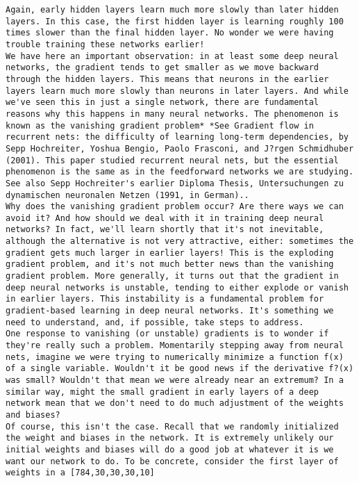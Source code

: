 \begin{lstlisting}
Again, early hidden layers learn much more slowly than later hidden layers. In this case, the first hidden layer is learning roughly 100 times slower than the final hidden layer. No wonder we were having trouble training these networks earlier!
We have here an important observation: in at least some deep neural networks, the gradient tends to get smaller as we move backward through the hidden layers. This means that neurons in the earlier layers learn much more slowly than neurons in later layers. And while we've seen this in just a single network, there are fundamental reasons why this happens in many neural networks. The phenomenon is known as the vanishing gradient problem* *See Gradient flow in recurrent nets: the difficulty of learning long-term dependencies, by Sepp Hochreiter, Yoshua Bengio, Paolo Frasconi, and J?rgen Schmidhuber (2001). This paper studied recurrent neural nets, but the essential phenomenon is the same as in the feedforward networks we are studying. See also Sepp Hochreiter's earlier Diploma Thesis, Untersuchungen zu dynamischen neuronalen Netzen (1991, in German)..
Why does the vanishing gradient problem occur? Are there ways we can avoid it? And how should we deal with it in training deep neural networks? In fact, we'll learn shortly that it's not inevitable, although the alternative is not very attractive, either: sometimes the gradient gets much larger in earlier layers! This is the exploding gradient problem, and it's not much better news than the vanishing gradient problem. More generally, it turns out that the gradient in deep neural networks is unstable, tending to either explode or vanish in earlier layers. This instability is a fundamental problem for gradient-based learning in deep neural networks. It's something we need to understand, and, if possible, take steps to address.
One response to vanishing (or unstable) gradients is to wonder if they're really such a problem. Momentarily stepping away from neural nets, imagine we were trying to numerically minimize a function f(x)
of a single variable. Wouldn't it be good news if the derivative f?(x)
was small? Wouldn't that mean we were already near an extremum? In a similar way, might the small gradient in early layers of a deep network mean that we don't need to do much adjustment of the weights and biases?
Of course, this isn't the case. Recall that we randomly initialized the weight and biases in the network. It is extremely unlikely our initial weights and biases will do a good job at whatever it is we want our network to do. To be concrete, consider the first layer of weights in a [784,30,30,30,10]

\end{lstlisting}
